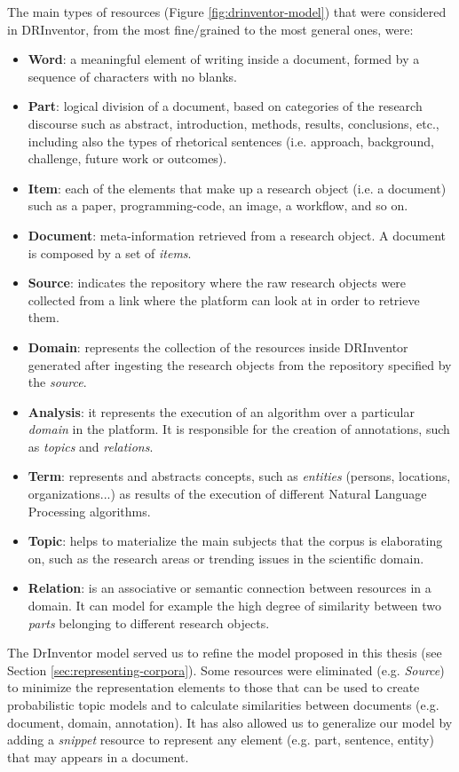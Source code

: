 The main types of resources (Figure \ref{fig:drinventor-model}) that were considered in DRInventor, from the most fine/grained to the most general ones, were:
\begin{itemize}
\item \textbf{Word}: a meaningful element of writing inside a document, formed by a sequence of characters with no blanks.
\item \textbf{Part}: logical division of a document, based on categories of the research discourse such as abstract, introduction, methods, results, conclusions, etc., including also the types of rhetorical sentences \citep{Ronzano2015} (i.e. approach, background, challenge, future work or outcomes).
\item \textbf{Item}: each of the elements that make up a research object (i.e. a document) such as a paper, programming-code, an image, a workflow, and so on.
\item \textbf{Document}: meta-information retrieved from a research object. A document is composed by a set of \textit{items}.
\item \textbf{Source}: indicates the repository where the raw research objects were collected from a link where the platform can look at in order to retrieve them.
\item \textbf{Domain}: represents the collection of the resources inside DRInventor generated after ingesting the research objects from the repository specified by the \textit{source}.
\item \textbf{Analysis}: it represents the execution of an algorithm over a particular \textit{domain} in the platform. It is responsible for the creation of annotations, such as \textit{topics} and \textit{relations}.
\item \textbf{Term}: represents and abstracts concepts, such as \textit{entities} (persons, locations, organizations...) as results of the execution of different Natural Language Processing algorithms.
\item \textbf{Topic}: helps to materialize the main subjects that the corpus is elaborating on, such as the research areas or trending issues in the scientific domain.
\item \textbf{Relation}: is an associative or semantic connection between resources in a domain. It can model for example the high degree of similarity between two \textit{parts} belonging to different research objects.
\end{itemize}

The DrInventor model served us to refine the model proposed in this thesis (see Section \ref{sec:representing-corpora}). Some resources were eliminated (e.g. \textit{Source}) to minimize the representation elements to those that can be used to create probabilistic topic models and to calculate similarities between documents (e.g. document, domain, annotation). It has also allowed us to generalize our model by adding a \textit{snippet} resource to represent any element (e.g. part, sentence, entity) that may appears in a document.


